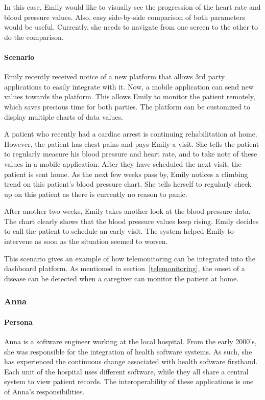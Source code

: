         In this case, Emily would like to visually see the progression of the heart rate and blood pressure values. Also, easy side-by-side comparison of both parameters would be useful. Currently, she needs to navigate from one screen to the other to do the comparison.
        
        \paragraph{Scenario} Emily recently received notice of a new platform that allows 3rd party applications to easily integrate with it. Now, a mobile application can send new values towards the platform. This allows Emily to monitor the patient remotely, which saves precious time for both parties. The platform can be customized to display multiple charts of data values.

        A patient who recently had a cardiac arrest is continuing rehabilitation at home. However, the patient has chest pains and pays Emily a visit. She tells the patient to regularly measure his blood pressure and heart rate, and to take note of these values in a mobile application. After they have scheduled the next visit, the patient is sent home. As the next few weeks pass by, Emily notices a climbing trend on this patient's blood pressure chart. She tells herself to regularly check up on this patient as there is currently no reason to panic.
        
        After another two weeks, Emily takes another look at the blood pressure data. The chart clearly shows that the blood pressure values keep rising. Emily decides to call the patient to schedule an early visit. The system helped Emily to intervene as soon as the situation seemed to worsen.\bigskip

        \noindent This scenario gives an example of how telemonitoring can be integrated into the dashboard platform. As mentioned in section~\ref{telemonitoring}, the onset of a disease can be detected when a caregiver can monitor the patient at home.

        \subsubsection{Anna}

        \paragraph{Persona} Anna is a software engineer working at the local hospital. From the early 2000's, she was responsible for the integration of health software systems. As such, she has experienced the continuous change associated with health software firsthand. Each unit of the hospital uses different software, while they all share a central system to view patient records. The interoperability of these applications is one of Anna's responsibilities.


